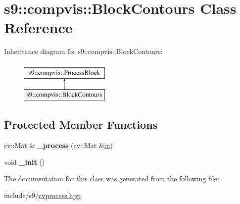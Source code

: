 \hypertarget{classs9_1_1compvis_1_1BlockContours}{\section{s9\-:\-:compvis\-:\-:\-Block\-Contours \-Class \-Reference}
\label{classs9_1_1compvis_1_1BlockContours}
}
\-Inheritance diagram for s9\-:\-:compvis\-:\-:\-Block\-Contours\-:\begin{figure}[H]
\begin{center}
\leavevmode
\includegraphics[height=2.000000cm]{classs9_1_1compvis_1_1BlockContours}
\end{center}
\end{figure}
\subsection*{\-Protected \-Member \-Functions}
\begin{DoxyCompactItemize}
\item 
\hypertarget{classs9_1_1compvis_1_1BlockContours_ad54b70506555865959a9ac7604591683}{cv\-::\-Mat \& {\bfseries \-\_\-process} (cv\-::\-Mat \&\hyperlink{structin}{in})}\label{classs9_1_1compvis_1_1BlockContours_ad54b70506555865959a9ac7604591683}

\item 
\hypertarget{classs9_1_1compvis_1_1BlockContours_a922e1ee73321dc1915c3aff43aff5e90}{void {\bfseries \-\_\-init} ()}\label{classs9_1_1compvis_1_1BlockContours_a922e1ee73321dc1915c3aff43aff5e90}

\end{DoxyCompactItemize}


\-The documentation for this class was generated from the following file\-:\begin{DoxyCompactItemize}
\item 
include/s9/\hyperlink{cvprocess_8hpp}{cvprocess.\-hpp}\end{DoxyCompactItemize}
